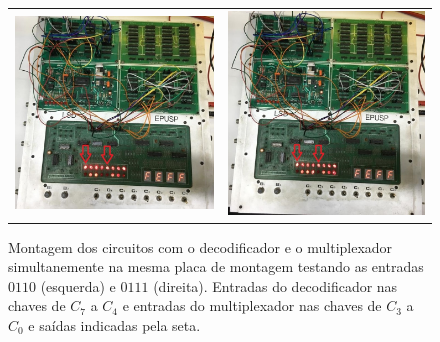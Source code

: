 \documentclass[a4,12pt]{horizon-theme}
\begin{document}
\begin{figure}[!ht]
  \centering
  \begin{tabular}{cc}
    \includegraphics[height=0.47\textwidth]{0110_in.jpeg} & \includegraphics[height=0.47\textwidth]{0111_in.jpeg}
  \end{tabular}
  \caption{Montagem dos circuitos com o decodificador e o multiplexador simultanemente na mesma placa de montagem testando as entradas $0110$ (esquerda) e $0111$ (direita). Entradas do decodificador nas chaves de $C_7$ a $C_4$ e entradas do multiplexador nas chaves de $C_3$ a $C_0$ e saídas indicadas pela seta.}
  \label{fig:montagem2}
\end{figure}
\end{document}
